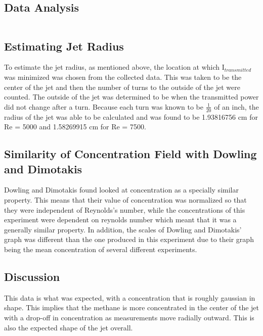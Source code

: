 \documentclass{article}
\begin{document}
\begin{center}
    \subsection*{Data Analysis}
\end{center}
$$$$
\begin{center}
    \subsection*{Estimating Jet Radius}
\end{center}
To estimate the jet radius, as mentioned above, the location at which I$_{transmitted}$ was minimized was chosen from the collected data.  This was taken to be the center of the jet and then the number of turns to the outside of the jet were counted.  The outside of the jet was determined to be when the transmitted power did not change after a turn.  Because each turn was known to be $\frac{1}{20}$ of an inch, the radius of the jet was able to be calculated and was found to be 1.93816756 cm for Re = 5000 and 1.58269915 cm for Re = 7500.

\begin{center}
    \subsection*{Similarity of Concentration Field with Dowling and Dimotakis}
\end{center}

Dowling and Dimotakis found looked at concentration as a specially similar property.  This means that their value of concentration was normalized so that they were independent of Reynolds's number, while the concentrations of this experiment were dependent on reynolds number which meant that it was a generally similar property.  In addition, the scales of Dowling and Dimotakis' graph was different than the one produced in this experiment due to their graph being the mean concentration of several different experiments. 

\begin{center}
    \subsection*{Discussion}
\end{center}
\indent This data is what was expected, with a concentration that is roughly gaussian in shape.  This implies that the methane is more concentrated in the center of the jet with a drop-off in concentration as measurements move radially outward.  This is also the expected shape of the jet overall. \newline
\end{document}
